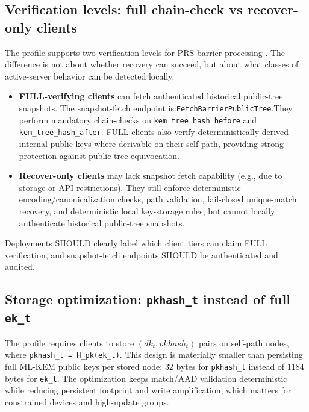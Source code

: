 \documentclass[11pt]{article}
\begin{document}
\subsection{Verification levels: full chain-check vs recover-only clients}
The profile supports two verification levels for PRS barrier processing \citep{citygSpec2026}. The difference is not about whether recovery can succeed, but about what classes of active-server behavior can be detected locally.
\begin{itemize}
  \item \textbf{FULL-verifying clients} can fetch authenticated historical public-tree snapshots. The snapshot-fetch endpoint is:\newline \texttt{FetchBarrierPublicTree}.\newline They perform mandatory chain-checks on \texttt{kem\_tree\_hash\_before} and \texttt{kem\_tree\_hash\_after}. FULL clients also verify deterministically derived internal public keys where derivable on their self path, providing strong protection against public-tree equivocation.
  \item \textbf{Recover-only clients} may lack snapshot fetch capability (e.g., due to storage or API restrictions). They still enforce deterministic encoding/canonicalization checks, path validation, fail-closed unique-match recovery, and deterministic local key-storage rules, but cannot locally authenticate historical public-tree snapshots.
\end{itemize}
Deployments SHOULD clearly label which client tiers can claim FULL verification, and snapshot-fetch endpoints SHOULD be authenticated and audited.

\subsection{Storage optimization: \texttt{pkhash\_t} instead of full \texttt{ek\_t}}
The profile requires clients to store \((dk_t, pkhash_t)\) pairs on self-path nodes, where \texttt{pkhash\_t = H\_pk(ek\_t)}. This design is materially smaller than persisting full ML-KEM public keys per stored node: \(32\) bytes for \texttt{pkhash\_t} instead of \(1184\) bytes for \texttt{ek\_t}. The optimization keeps match/AAD validation deterministic while reducing persistent footprint and write amplification, which matters for constrained devices and high-update groups.
\end{document}
